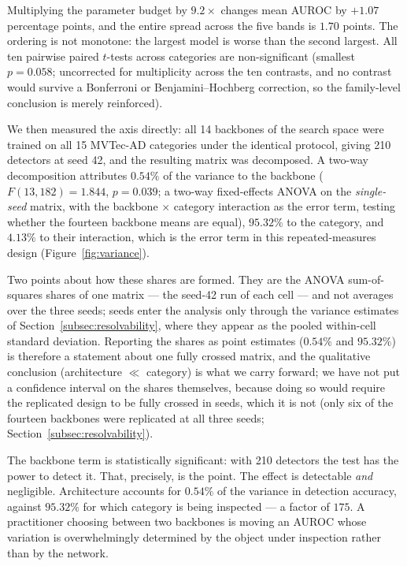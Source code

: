 Multiplying the parameter budget by $9.2\times$ changes mean AUROC by
$+1.07$ percentage points, and the entire spread across the five bands is
$1.70$ points. The ordering is not monotone: the largest model is worse than the
second largest. All ten pairwise paired $t$-tests across categories are
non-significant (smallest $p = 0.058$; uncorrected for
multiplicity across the ten contrasts, and no contrast would survive a
Bonferroni or Benjamini--Hochberg correction, so the family-level conclusion is
merely reinforced).

We then measured the axis directly: all 14 backbones of the search space were
trained on all 15 MVTec-AD categories under the identical protocol, giving 210
detectors at seed 42, and the resulting matrix was decomposed. A two-way
decomposition attributes \textbf{$0.54\%$} of the variance to the backbone
($F(13,182) = 1.844$, $p = 0.039$; a two-way fixed-effects ANOVA on the
\emph{single-seed} matrix, with the backbone $\times$ category interaction as the
error term, testing whether the fourteen backbone means are equal),
\textbf{$95.32\%$} to the category, and
$4.13\%$ to their interaction, which is the error term in this repeated-measures
design (Figure~\ref{fig:variance}).

Two points about how these shares are formed. They are the ANOVA sum-of-squares
shares of one matrix --- the seed-42 run of each cell --- and not averages over
the three seeds; seeds enter the analysis only through the variance estimates of
Section~\ref{subsec:resolvability}, where they appear as the pooled within-cell
standard deviation. Reporting the shares as point estimates ($0.54\%$ and
$95.32\%$) is therefore a statement about one fully crossed matrix, and the
qualitative conclusion (architecture $\ll$ category) is what we carry forward; we
have not put a confidence interval on the shares themselves, because doing so
would require the replicated design to be fully crossed in seeds, which it is not
(only six of the fourteen backbones were replicated at all three seeds;
Section~\ref{subsec:resolvability}).

The backbone term is statistically significant: with 210 detectors the test has
the power to detect it. That, precisely, is the point. The effect is detectable
\emph{and} negligible. Architecture accounts for $0.54\%$ of the variance in
detection accuracy, against $95.32\%$ for which category is being inspected --- a
factor of $175$. A practitioner choosing between two backbones is moving an
AUROC whose variation is overwhelmingly determined by the object under
inspection rather than by the network.

